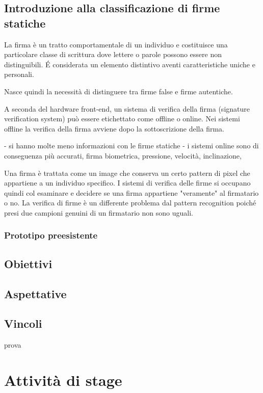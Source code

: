 \subsection{Introduzione alla classificazione di firme statiche}
\label{2.1}
La firma è un tratto comportamentale di un individuo e costituisce una particolare classe di scrittura dove lettere o parole possono essere non distinguibili. \'{E} considerata un elemento distintivo aventi caratteristiche uniche e personali. 

Nasce quindi la necessità di distinguere tra firme false e firme autentiche.

A seconda del hardware front-end, un sistema di verifica della firma (signature verification system) può essere etichettato come offline o online. Nei sistemi offline la verifica della firma avviene dopo la sottoscrizione della firma. 

- si hanno molte meno informazioni con le firme statiche
- i sistemi online sono di conseguenza più accurati, firma biometrica, pressione, velocità, inclinazione,

Una firma è trattata come un image che conserva un certo pattern di pixel che appartiene a un individuo specifico. I sistemi di verifica delle firme si occupano quindi col esaminare e decidere se una firma appartiene "veramente" al firmatario o no. La verifica di firme è un differente problema dal pattern recognition poiché presi due campioni genuini di un firmatario non sono uguali.

\subsubsection{Prototipo preesistente}
\label{2.1.1}

\subsection{Obiettivi}
\label{2.2}

\subsection{Aspettative}
\label{2.3}

\subsection{Vincoli}
\label{2.4}
\gls{prova}

\newpage

\section{Attività di stage}
\label{3.0}

